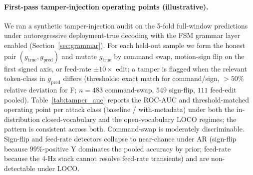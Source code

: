 \documentclass[sensors,article,submit,moreauthors,pdftex]{Definitions/mdpi}
\begin{document}
\paragraph{First-pass tamper-injection operating points (illustrative).} We ran a synthetic tamper-injection audit on the 5-fold full-window predictions under autoregressive deployment-true decoding with the FSM grammar layer enabled (Section~\ref{sec:grammar}). For each held-out sample we form the honest pair $(g_{\text{true}}, g_{\text{pred}})$ and mutate $g_{\text{true}}$ by command swap, motion-sign flip on the first signed axis, or feed-rate $\pm 10\times$ edit; a tamper is flagged when the relevant token-class in $g_{\text{pred}}$ differs (thresholds: exact match for command/sign, $>50\%$ relative deviation for F; $n\!=\!483$ command-swap, $549$ sign-flip, $111$ feed-edit pooled). Table~\ref{tab:tamper_auc} reports the ROC-AUC and threshold-matched operating point per attack class (baseline / with-metadata) under both the in-distribution closed-vocabulary and the open-vocabulary LOCO regimes; the pattern is consistent across both. Command-swap is moderately discriminable. Sign-flip and feed-rate detectors collapse to near-chance under AR (sign-flip because $99\%$-positive Y dominates the pooled accuracy by prior; feed-rate because the 4-Hz stack cannot resolve feed-rate transients) and are non-detectable under LOCO.
\end{document}
